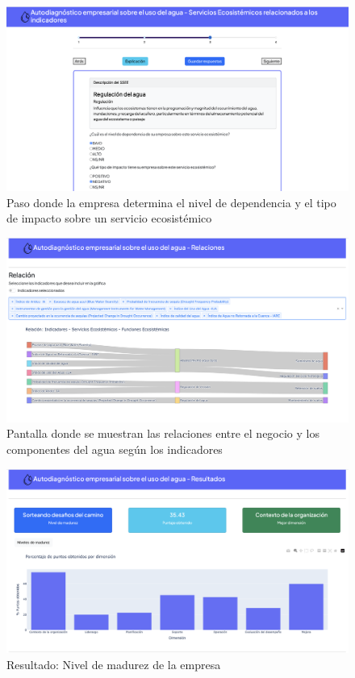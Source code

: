 \begin{figure}[H]
        \centering
        \includegraphics[scale=0.25]{images/99-aplicacion-web/6-ssee.png}
        \caption{Paso donde la empresa determina el nivel de dependencia y el tipo de impacto sobre un servicio ecosistémico}
\end{figure}

\begin{figure}[H]
        \centering
        \includegraphics[scale=0.25]{images/99-aplicacion-web/7-relaciones.png}
        \caption{Pantalla donde se muestran las relaciones entre el negocio y los componentes del agua según los indicadores}
\end{figure}

\begin{figure}[H]
        \centering
        \includegraphics[scale=0.25]{images/99-aplicacion-web/8-mm.png}
        \caption{Resultado: Nivel de madurez de la empresa}
\end{figure}

